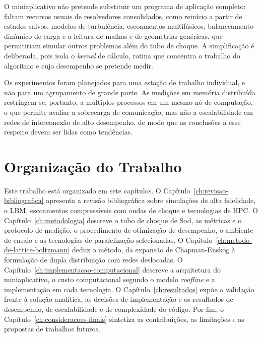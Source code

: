 O miniaplicativo não pretende substituir um programa de aplicação completo: faltam recursos usuais de resolvedores consolidados, como reinício a partir de estados salvos, modelos de turbulência, escoamentos multifásicos, balanceamento dinâmico de carga e a leitura de malhas e de geometrias genéricas, que permitiriam simular outros problemas além do tubo de choque.
A simplificação é deliberada, pois isola o \textit{kernel} de cálculo, rotina que concentra o trabalho do algoritmo e cujo desempenho se pretende medir.

Os experimentos foram planejados para uma estação de trabalho individual, e não para um agrupamento de grande porte.
As medições em memória distribuída restringem-se, portanto, a múltiplos processos em um mesmo nó de computação, o que permite avaliar a sobrecarga de comunicação, mas não a escalabilidade em redes de interconexão de alto desempenho, de modo que as conclusões a esse respeito devem ser lidas como tendências.


\section{Organização do Trabalho}\label{sec:organizacao-do-trabalho}

Este trabalho está organizado em sete capítulos.
O Capítulo~\ref{ch:revisao-bibliografica} apresenta a revisão bibliográfica sobre simulações de alta fidelidade, o LBM, escoamentos compressíveis com ondas de choque e tecnologias de HPC.
O Capítulo~\ref{ch:metodologia} descreve o tubo de choque de Sod, as métricas e o protocolo de medição, o procedimento de otimização de desempenho, o ambiente de ensaio e as tecnologias de paralelização selecionadas.
O Capítulo~\ref{ch:metodo-de-lattice-boltzmann} deduz o método, da expansão de Chapman-Enskog à formulação de dupla distribuição com redes deslocadas.
O Capítulo~\ref{ch:implementacao-computacional} descreve a arquitetura do miniaplicativo, o custo computacional segundo o modelo \textit{roofline} e a implementação em cada tecnologia.
O Capítulo~\ref{ch:resultados} expõe a validação frente à solução analítica, as decisões de implementação e os resultados de desempenho, de escalabilidade e de complexidade do código.
Por fim, o Capítulo~\ref{ch:consideracoes-finais} sintetiza as contribuições, as limitações e as propostas de trabalhos futuros.
